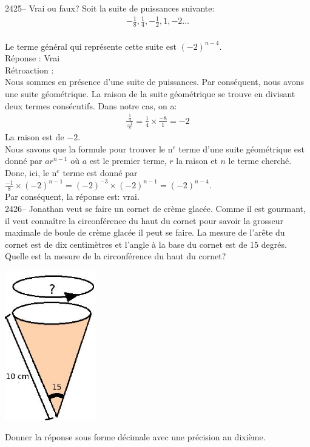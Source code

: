 \documentclass[letterpaper, 12pt]{article}
\begin{document}
2425-- Vrai ou faux? Soit la suite de puissances suivante:\\
\begin{eqnarray*}
-\frac{1}{8}, \frac{1}{4}, -\frac{1}{2}, 1 , -2 \ldots
\end{eqnarray*}\\
Le terme g\'en\'eral qui repr\'esente cette suite est $(-2)^{n-4}$. \\

R\'eponse : Vrai\\

R\'etroaction :\\
Nous sommes en pr\'esence d'une suite de puissances. Par cons\'equent, nous avons une suite g\'eom\'etrique. La raison de la suite g\'eom\'etrique se trouve en divisant deux termes cons\'ecutifs. Dans notre cas, on a:
\begin{eqnarray*}
 \frac{\frac{1}{4}}{\frac{-1}{8}}=\frac{1}{4}\times\frac{-8}{1}=-2
\end{eqnarray*}
La raison est de $-2$.\\
Nous savons que la formule pour trouver le n$^{e}$ terme d'une suite g\'eom\'etrique est donn\'e par $ar^{n-1}$ o\`u $a$ est le premier terme, $r$ la raison et $n$ le terme cherch\'e. Donc, ici, le n$^{e}$ terme est donn\'e par $\frac{-1}{8}\times (-2)^{n-1}= (-2)^{-3}\times (-2)^{n-1}=(-2)^{n-4}$.\\
Par cons\'equent, la r\'eponse est: vrai.\\

2426-- Jonathan veut se faire un cornet de cr\`eme glac\'ee. Comme il est gourmant, il veut conna\^itre la circonf\'erence du haut du cornet pour savoir la grosseur maximale de boule de cr\`eme glac\'ee il peut se faire. La mesure de l'ar\^ete du cornet est de dix centim\`etres et l'angle \`a la base du cornet est de 15 degr\'es. Quelle est la mesure de la circonf\'erence du haut du cornet? \\
\begin{center}
 \includegraphics[width=4cm,bb=14 14 225 339]{Q2426a.eps}
\end{center}
Donner la r\'eponse sous forme d\'ecimale avec une pr\'ecision au dixi\`eme.\\
\end{document}
